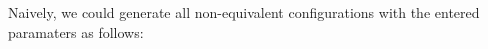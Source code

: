 \documentclass[12pt]{amsart}
\theoremstyle{plain}
\DeclareMathOperator{\Reps}{reps}
\begin{document}
Naively, we could generate all non-equivalent configurations with the entered paramaters as follows:
\end{document}
